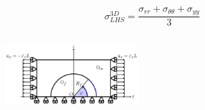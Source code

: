 \documentclass[first,firstsupp,lastsupp,last,hyperref,table]{ETHclass}
\begin{document}
\begin{frame}
\begin{columns}[c]
\begin{column}{0.5\textwidth}
\begin{figure}
\end{figure}
\vspace{-0.5cm}
\scriptsize
\begin{equation*}
\sigma^{3D}_{LHS}=\frac{\sigma_{rr}+\sigma_{\theta\theta}+\sigma_{yy}}{3}
\end{equation*}
\end{column}
\end{columns}
\vspace{-0.3cm}
\centering
\begin{figure}
\centering
\includegraphics[width=0.45\textwidth]{refAngle.pdf}
\end{figure}
\end{frame}

\addtocounter{framenumber}{-1}
\end{document}
